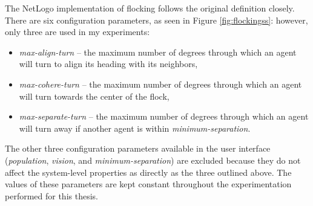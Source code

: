 The NetLogo implementation of flocking follows the original definition closely.
There are six configuration parameters, as seen in Figure \ref{fig:flockingss}: however, only three are used in my experiments:
\begin{itemize}
\item \textit{max-align-turn} -- the maximum number of degrees through which an agent will turn to align its heading with its neighbors,
\item \textit{max-cohere-turn} -- the maximum number of degrees through which an agent will turn towards the center of the flock,
\item \textit{max-separate-turn} -- the maximum number of degrees through which an agent will turn away if another agent is within \textit{minimum-separation}.
\end{itemize}
The other three configuration parameters available in the user interface (\textit{population}, \textit{vision}, and \textit{minimum-separation}) are excluded because they do not affect the system-level properties as directly as the three outlined above.
The values of these parameters are kept constant throughout the experimentation performed for this thesis.

